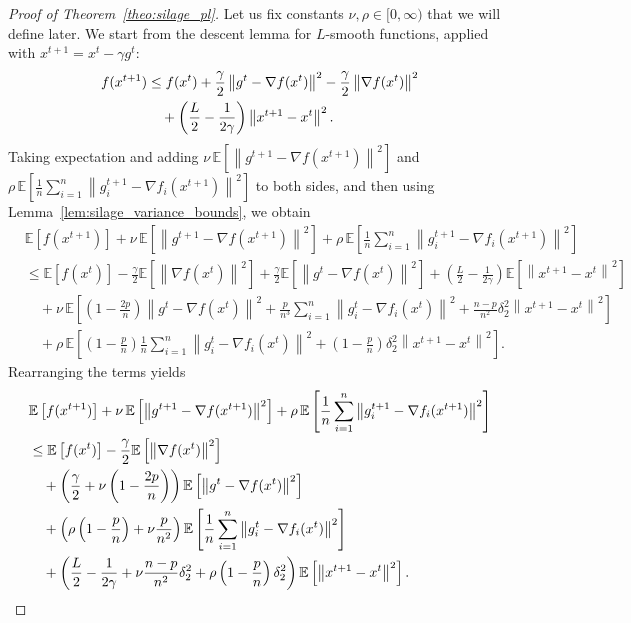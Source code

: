\documentclass{article}
\newcommand{\bb}{\mathbb}
\newcommand{\sqn}[1]{\left\| #1 \right\|^2}
\newcommand{\Exp}[1]{{\bb E}\left[#1\right]}
\theoremstyle{plain}
\begin{document}
\begin{proof}[Proof of Theorem~\ref{theo:silage_pl}]
Let us fix constants $\nu,\rho\in[0,\infty)$ that we will define later.
We start from the descent lemma for $L$-smooth functions, applied with $x^{t+1}=x^t-\gamma g^t$:
\begin{align}
f(x^{t+1})
&\leq f(x^t) + \frac{\gamma}{2}\sqn{g^{t}-\nabla f(x^t)}-\frac{\gamma}{2}\sqn{\nabla f(x^t)} \notag\\
&\quad + \left(\frac{L}{2}-\frac{1}{2\gamma}\right)\sqn{x^{t+1}-x^t}.
\label{eq:descent_pl_silage}
\end{align}
Taking expectation and adding $\nu\,\Exp{\sqn{g^{t+1}-\nabla f(x^{t+1})}}$ and
$\rho\,\Exp{\frac{1}{n}\sum_{i=1}^n\sqn{g_i^{t+1}-\nabla f_i(x^{t+1})}}$ to both sides, and then using Lemma~\ref{lem:silage_variance_bounds}, we obtain
\begin{align*}
&\Exp{f(x^{t+1})} + \nu\,\Exp{\sqn{g^{t+1}-\nabla f(x^{t+1})}}
+ \rho\,\Exp{\frac{1}{n}\sum_{i=1}^n\sqn{g_i^{t+1}-\nabla f_i(x^{t+1})}}\\
&\leq \Exp{f(x^t)} -\frac{\gamma}{2}\Exp{\sqn{\nabla f(x^t)}}
+ \frac{\gamma}{2}\Exp{\sqn{g^{t}-\nabla f(x^t)}}
+ \left(\frac{L}{2}-\frac{1}{2\gamma}\right)\Exp{\sqn{x^{t+1}-x^t}}\\
&\quad+\nu\,\Exp{\left(1-\frac{2p}{n}\right)\sqn{g^t-\nabla f(x^t)}
+\frac{p}{n^3}\sum_{i=1}^n\sqn{g_{i}^t-\nabla f_{i}(x^{t})}
+\frac{n-p}{n^2}\delta_2^2\sqn{x^{t+1}-x^t}}\\
&\quad+\rho\,\Exp{\left(1-\frac{p}{n}\right)\frac{1}{n}\sum_{i=1}^n\sqn{g_i^{t}-\nabla f_i(x^{t})}
+\left(1-\frac{p}{n}\right)\delta_2^2\sqn{x^{t+1}-x^t}}.
\end{align*}
Rearranging the terms yields
\begin{align}
&\Exp{f(x^{t+1})} + \nu\,\Exp{\sqn{g^{t+1}-\nabla f(x^{t+1})}}
+ \rho\,\Exp{\frac{1}{n}\sum_{i=1}^n\sqn{g_i^{t+1}-\nabla f_i(x^{t+1})}}\notag\\
&\leq \Exp{f(x^t)} -\frac{\gamma}{2}\Exp{\sqn{\nabla f(x^t)}} \notag\\
&\quad+\left(\frac{\gamma}{2}+\nu\left(1-\frac{2p}{n}\right)\right)\Exp{\sqn{g^{t}-\nabla f(x^t)}}\notag\\
&\quad+\left(\rho\left(1-\frac{p}{n}\right)+\nu\frac{p}{n^2}\right)
\Exp{\frac{1}{n}\sum_{i=1}^n\sqn{g_{i}^t-\nabla f_{i}(x^{t})}}\notag\\
&\quad+\left(\frac{L}{2}-\frac{1}{2\gamma}
+\nu\frac{n-p}{n^2}\delta_2^2
+\rho\left(1-\frac{p}{n}\right)\delta_2^2\right)\Exp{\sqn{x^{t+1}-x^t}}.
\label{eq:pl_silage_prechoice}
\end{align}


\end{proof}
\end{document}
